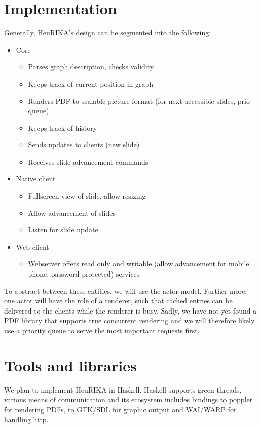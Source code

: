\documentclass[a4paper,11pt,notitlepage]{scrreprt}
\begin{document}
\section{Implementation}
Generally, HeuRIKA's design can be segmented into the following:
\begin{itemize}
	\item Core
		\begin{itemize}
			\item Parses graph description, checks validity
			\item Keeps track of current position in graph
			\item Renders PDF to scalable picture format (for next accessible slides, prio queue)
			\item Keeps track of history
			\item Sends updates to clients (new slide)
			\item Receives slide advancement commands
		\end{itemize}
	\item Native client
		\begin{itemize}
			\item Fullscreen view of slide, allow resizing
			\item Allow advancement of slides
			\item Listen for slide update
		\end{itemize}
	\item Web client
		\begin{itemize}
			\item Webserver offers read only and writable (allow advancement for mobile phone, password protected) services
		\end{itemize}
\end{itemize}
To abstract between these entities, we will use the actor model. Further more, one actor will have the role of a renderer, such that cached entries can be delivered to the clients while the renderer is busy. Sadly, we have not yet found a PDF library that supports true concurrent rendering and we will therefore likely use a priority queue to serve the most important requests first.

\newpage
\section{Tools and libraries}
We plan to implement HeuRIKA in Haskell. Haskell supports green threads, various means of communication and its ecosystem includes bindings to poppler for rendering PDFs, to GTK/SDL for graphic output and WAI/WARP for handling http.
\end{document}
